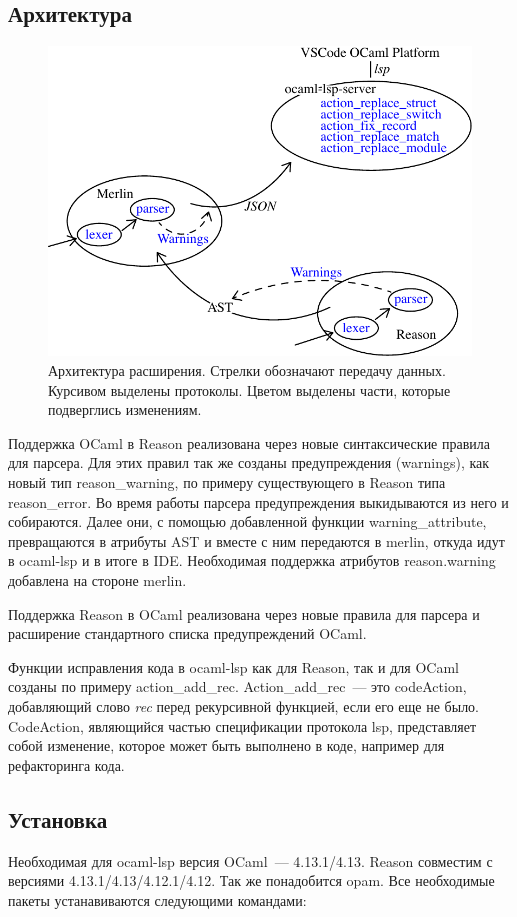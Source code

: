 \subsection{Архитектура}
\begin{figure}[h]
	\includegraphics[width=\linewidth]{graph.pdf}
\caption{Архитектура расширения. Стрелки обозначают передачу данных. Курсивом выделены протоколы. Цветом выделены части, которые подверглись изменениям.}
\end{figure}
Поддержка OCaml в Reason реализована через новые синтаксические правила для парсера. Для этих правил так же созданы предупреждения (warnings), как новый тип reason\_warning, по примеру существующего в Reason типа reason\_error. Во время работы парсера предупреждения выкидываются из него и собираются. Далее они, с помощью добавленной функции warning\_attribute, превращаются в атрибуты AST и вместе с ним передаются в merlin, откуда идут в ocaml-lsp и в итоге в IDE. Необходимая поддержка атрибутов reason.warning добавлена на стороне merlin.

Поддержка Reason в OCaml реализована через новые правила для парсера и расширение стандартного списка предупреждений OCaml.

Функции исправления кода в ocaml-lsp как для Reason, так и для OCaml созданы по примеру action\_add\_rec. Action\_add\_rec~--- это code\-Action, добавляющий слово {\it rec} перед рекурсивной функцией, если его еще не было. CodeAction, являющийся частью спецификации протокола lsp, представляет собой изменение, которое может быть выполнено в коде, например для рефакторинга кода.

\subsection{Установка}
Необходимая для ocaml-lsp версия OCaml~--- 4.13.1/4.13. Reason совместим с версиями 4.13.1/4.13/4.12.1/4.12. Так же понадобится opam. Все необходимые пакеты устанавиваются следующими командами:

